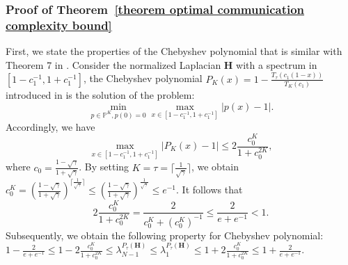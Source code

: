 \documentclass[12pt,draftcls,onecolumn]{IEEEtran}
\begin{document}
\subsubsection{Proof of Theorem~\ref{theorem optimal communication complexity bound}}\label{proof theorem optimal communication complexity bound}
First, we state the properties of the Chebyshev polynomial that is similar with Theorem 7 in \cite{xu2020accelerated}. Consider the normalized Laplacian $\mathbf{H}$ with a spectrum in $[1-c_1^{-1},1+c_1^{-1}]$, the Chebyshev polynomial $P_{K}(x)=1-\frac{T_{\tau}(c_1(1-x))}{T_{K}(c_1)}$ introduced in \cite{auzinger2011iterative,arioli2014chebyshev} is the solution of the problem: 
\begin{equation*}
	\min_{p\in \mathbb{P}^{K},p(0)=0} \max_{x\in[1-c_1^{-1},1+c_1^{-1}]} |p(x)-1|. 
\end{equation*}
Accordingly, we have 
\begin{equation*}
	\max_{x\in[1-c_1^{-1},1+c_1^{-1}]} |P_K(x)-1| \leq 2\frac{c_0^K}{1+c_0^{2K}},
\end{equation*}
where $c_0=\frac{1-\sqrt{\gamma}}{1+\sqrt{\gamma}}$. By setting $K=\tau=\lceil \frac{1}{\sqrt{\gamma}} \rceil$, we obtain 
$c_0^K=(\frac{1-\sqrt{\gamma}}{1+\sqrt{\gamma}})^{\lceil \frac{1}{\sqrt{\gamma}} \rceil} \leq (\frac{1-\sqrt{\gamma}}{1+\sqrt{\gamma}})^{\frac{1}{\sqrt{\gamma}}} \leq e^{-1}$. 
It follows that 
\begin{equation}
	2\frac{c_0^K}{1+c_0^{2K}}=\frac{2}{c_0^K+(c_0^{K})^{-1}}\leq \frac{2}{e+e^{-1}}<1.
\end{equation}
Subsequently, we obtain the following property for Chebyshev polynomial: 
$1-\frac{2}{e+e^{-1}}\leq 1-2\frac{c_0^K}{1+c_0^{2K}}\leq \lambda_{N-1}^{P_{\tau}(\mathbf{H})}\leq \lambda_{1}^{P_{\tau}(\mathbf{H})}
    \leq 1+2\frac{c_0^K}{1+c_0^{2K}} \leq 1+ \frac{2}{e+e^{-1}}.$
\end{document}

